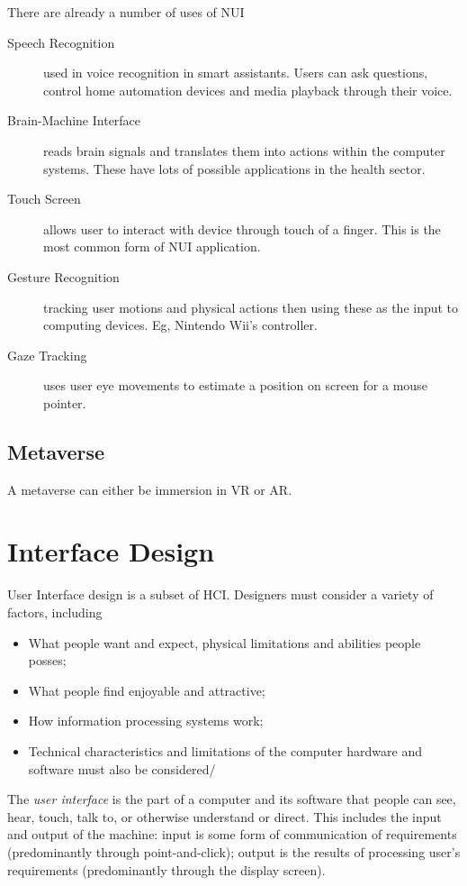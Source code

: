 There are already a number of uses of NUI
\begin{description}
    \item[Speech Recognition] used in voice recognition in smart assistants. Users can ask questions, control home automation devices and media playback through their voice. 
    \item[Brain-Machine Interface] reads brain signals and translates them into actions within the computer systems. These have lots of possible applications in the health sector.
    \item[Touch Screen] allows user to interact with device through touch of a finger. This is the most common form of NUI application.
    \item[Gesture Recognition] tracking user motions and physical actions then using these as the input to computing devices. Eg, Nintendo Wii's controller.
    \item[Gaze Tracking] uses user eye movements to estimate a position on screen for a mouse pointer.
\end{description}

\subsection*{Metaverse}

A metaverse can either be immersion in VR or AR. 

\section*{Interface Design}
User Interface design is a subset of HCI. Designers must consider a variety of factors, including
\begin{itemize}
    \item What people want and expect, physical limitations and abilities people posses;
    \item What people find enjoyable and attractive;
    \item How information processing systems work;
    \item Technical characteristics and limitations of the computer hardware and software must also be considered/
\end{itemize}

The \textit{user interface} is the part of a computer and its software that people can see, hear, touch, talk to, or otherwise understand or direct. This includes the input and output of the machine: input is some form of communication of requirements (predominantly through point-and-click); output is the results of processing user's requirements (predominantly through the display screen).

